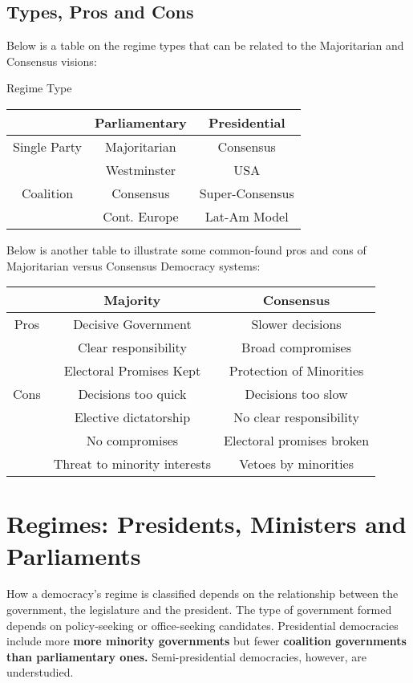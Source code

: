 \documentclass[12pt, letterpaper]{article}
\begin{document}
\subsection{Types, Pros and Cons}
Below is a table on the regime types that can be related to the Majoritarian and Consensus visions:
\begin{center}
	Regime Type\\
	\begin{tabular}{c|c|c}
		& Parliamentary & Presidential\\
		\hline
		Single Party & Majoritarian & Consensus\\
			     & Westminster & USA\\
		\hline
		Coalition & Consensus & Super-Consensus\\
			  & Cont. Europe & Lat-Am Model\\
	\end{tabular}
\end{center}
Below is another table to illustrate some common-found pros and cons of Majoritarian versus Consensus Democracy systems:
\begin{center}
	\begin{tabular}{c|c|c}
		& Majority & Consensus\\
		\hline
		Pros & Decisive Government & Slower decisions\\
		     & Clear responsibility & Broad compromises\\
		     & Electoral Promises Kept & Protection of Minorities\\
		\hline
		Cons & Decisions too quick & Decisions too slow\\
		     & Elective dictatorship & No clear responsibility\\
		     & No compromises & Electoral promises broken\\
		     & Threat to minority interests & Vetoes by minorities
	\end{tabular}
\end{center}


\newpage
\section{Regimes: Presidents, Ministers and Parliaments}
How a democracy's regime is classified depends on the relationship between the government, the legislature and the president. The type of government formed depends on policy-seeking or office-seeking candidates.
Presidential democracies include more \textbf{more minority governments} but fewer \textbf{coalition governments than parliamentary ones.} Semi-presidential democracies, however, are understudied.
\end{document}
